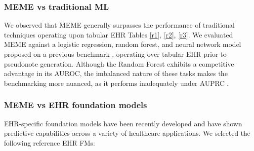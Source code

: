 \documentclass{article}
\theoremstyle{plain}
\theoremstyle{definition}
\theoremstyle{remark}
\begin{document}
\subsubsection{MEME vs traditional ML}
We observed that MEME {generally} surpasses the performance of {traditional techniques operating upon tabular EHR {Tables \ref{r1}, \ref{r2}, \ref{r3}}. We evaluated MEME against a logistic regression, random forest, and neural network model proposed on a previous benchmark \citep{xie2022benchmarking}, operating over tabular EHR prior to pseudonote generation.} Although the Random Forest exhibits a competitive advantage in its AUROC, the imbalanced nature of these tasks makes the benchmarking more nuanced, as it performs inadequately under AUPRC \citep{saito2015precision}.

\subsubsection{MEME vs EHR foundation models}

{EHR-specific foundation models have been recently developed and have shown predictive capabilities across a variety of healthcare applications. We selected the following reference EHR FMs:}
\end{document}

